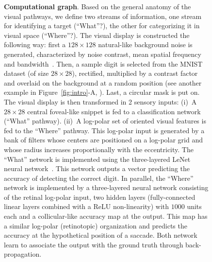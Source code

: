 \begin{figure}[t!]%
	\caption{%
		{\bf Computational graph}. Based on the general anatomy of the visual pathways, we define two streams of information, one stream for identifying a target (``What''?), the other for categorizing it in visual space (``Where''?).
		\A The visual display is constructed the following way: first a $128\times 128$ natural-like background noise is generated, characterized by noise contrast, mean spatial frequency and bandwidth~\cite{Sanz12}. Then, a sample digit is selected from the MNIST dataset (of size $28\times 28$), rectified, multiplied by a contrast factor and overlaid on the background at a random position (see another example in Figure~\ref{fig:intro}-A, \DIS ). Last, a circular mask is put on. %
		\B The visual display is then transformed in 2 sensory inputs: (i)~A $28\times 28$ central foveal-like snippet is fed to a classification network (``What'' pathway). (ii)~A log-polar set of oriented visual features is fed to the ``Where'' pathway. This log-polar input is generated by a bank of filters whose centers are positioned on a log-polar grid and whose radius increases proportionally with the eccentricity. %
		\C The ``What'' network is implemented using the three-layered LeNet neural network~\cite{Lecun1998}. This network outputs a vector predicting the accuracy of detecting the correct digit. In parallel, the ``Where'' network is implemented by a three-layered neural network consisting of the retinal log-polar input, two hidden layers (fully-connected linear layers combined with a ReLU non-linearity) with $1000$ units each and a collicular-like accuracy map at the output. This map has a similar log-polar (retinotopic) organization and predicts the accuracy at the hypothetical position of a saccade. Both network learn to associate the output with the ground truth through back-propagation.
}
\end{figure}
